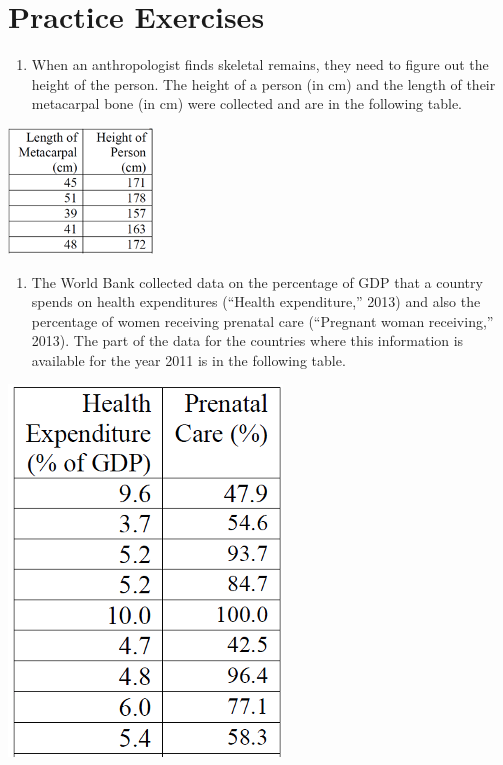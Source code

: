 \documentclass[
]{book}
\providecommand{\tightlist}{%
  \setlength{\itemsep}{0pt}\setlength{\parskip}{0pt}}
\begin{document}
\hfill\break

\hypertarget{practice-exercises-5}{%
\section{Practice Exercises}\label{practice-exercises-5}}

\begin{enumerate}
\def\labelenumi{\arabic{enumi}.}
\tightlist
\item
  When an anthropologist finds skeletal remains, they need to figure out the height of the person. The height of a person (in cm) and the length of their metacarpal bone (in cm) were collected and are in the following table.
\end{enumerate}

\begin{center}\includegraphics[width=0.5\linewidth]{week12/ex01} \end{center}

\begin{enumerate}
\def\labelenumi{\arabic{enumi}.}
\setcounter{enumi}{1}
\tightlist
\item
  The World Bank collected data on the percentage of GDP that a country spends on health expenditures (``Health expenditure,'' 2013) and also the percentage of women receiving prenatal care (``Pregnant woman receiving,'' 2013). The part of the data for the countries where this information is available for the year 2011 is in the following table.
\end{enumerate}

\begin{center}\includegraphics[width=0.5\linewidth]{week12/ex02} \end{center}
\end{document}
